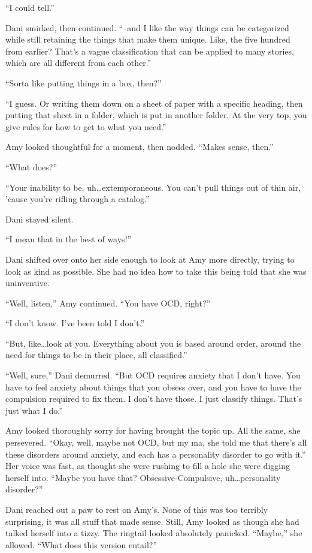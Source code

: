 ``I could tell.''

Dani smirked, then continued. ``--and I like the way things can be categorized while still retaining the things that make them unique. Like, the five hundred from earlier? That's a vague classification that can be applied to many stories, which are all different from each other.''

``Sorta like putting things in a box, then?''

``I guess. Or writing them down on a sheet of paper with a specific heading, then putting that sheet in a folder, which is put in another folder. At the very top, you give rules for how to get to what you need.''

Amy looked thoughtful for a moment, then nodded. ``Makes sense, then.''

``What does?''

``Your inability to be, uh\ldots{}extemporaneous. You can't pull things out of thin air, 'cause you're rifling through a catalog.''

Dani stayed silent.

``I mean that in the best of ways!''

Dani shifted over onto her side enough to look at Amy more directly, trying to look as kind as possible. She had no idea how to take this being told that she was uninventive.

``Well, listen,'' Amy continued. ``You have OCD, right?''

``I don't know. I've been told I don't.''

``But, like\ldots{}look at you. Everything about you is based around order, around the need for things to be in their place, all classified.''

``Well, sure,'' Dani demurred. ``But OCD requires anxiety that I don't have. You have to feel anxiety about things that you obsess over, and you have to have the compulsion required to fix them. I don't have those. I just classify things. That's just what I do.''

Amy looked thoroughly sorry for having brought the topic up. All the same, she persevered. ``Okay, well, maybe not OCD, but my ma, she told me that there's all these disorders around anxiety, and each has a personality disorder to go with it.'' Her voice was fast, as thought she were rushing to fill a hole she were digging herself into. ``Maybe you have that? Obsessive-Compulsive, uh\ldots{}personality disorder?''

Dani reached out a paw to rest on Amy's. None of this was too terribly surprising, it was all stuff that made sense. Still, Amy looked as though she had talked herself into a tizzy. The ringtail looked absolutely panicked. ``Maybe,'' she allowed. ``What does this version entail?''

